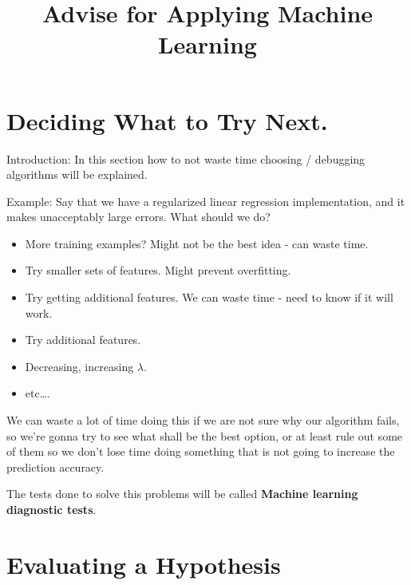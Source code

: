 \documentclass[10pt]{extarticle}
\begin{document}
 



\title{Advise for Applying Machine Learning}

    
    \date{}
    

    

    \maketitle

\newpage





\section{Deciding What to Try Next.}\label{deciding-what-to-try-next.}

Introduction: In this section how to not waste time choosing / debugging
algorithms will be explained.

Example: Say that we have a regularized linear regression
implementation, and it makes unacceptably large errors. What should we
do?

\begin{itemize}
\itemsep1pt\parskip0pt
\item
  More training examples? Might not be the best idea - can waste time.
\item
  Try smaller sets of features. Might prevent overfitting.
\item
  Try getting additional features. We can waste time - need to know if
  it will work.
\item
  Try additional features.
\item
  Decreasing, increasing $\lambda$.
\item
  etc\ldots{}.
\end{itemize}

We can waste a lot of time doing this if we are not sure why our
algorithm fails, so we're gonna try to see what shall be the best
option, or at least rule out some of them so we don't lose time doing
something that is not going to increase the prediction accuracy.

The tests done to solve this problems will be called \textbf{Machine
learning diagnostic tests}.

\section{Evaluating a Hypothesis}\label{evaluating-a-hypothesis}
\end{document}
